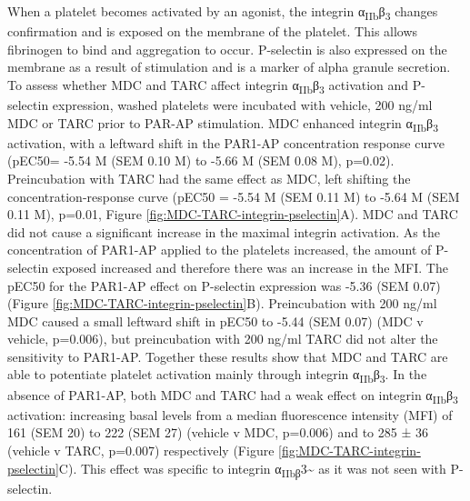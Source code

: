 \documentclass[11pt,twoside]{bristolthesis}
\begin{document}
When a platelet becomes activated by an agonist, the integrin α\textsubscript{IIb}β\textsubscript{3} changes confirmation and is exposed on the membrane of the platelet. This allows fibrinogen to bind and aggregation to occur. P-selectin is also expressed on the membrane as a result of stimulation and is a marker of alpha granule secretion. To assess whether MDC and TARC affect integrin α\textsubscript{IIb}β\textsubscript{3} activation and P-selectin expression, washed platelets were incubated with vehicle, 200 ng/ml MDC or TARC prior to PAR-AP stimulation. MDC enhanced integrin α\textsubscript{IIb}β\textsubscript{3} activation, with a leftward shift in the PAR1-AP concentration response curve (pEC50= -5.54 M (SEM 0.10 M) to -5.66 M (SEM 0.08 M), p=0.02). Preincubation with TARC had the same effect as MDC, left shifting the concentration-response curve (pEC50 = -5.54 M (SEM 0.11 M) to -5.64 M (SEM 0.11 M), p=0.01, Figure \ref{fig:MDC-TARC-integrin-pselectin}A). MDC and TARC did not cause a significant increase in the maximal integrin activation. As the concentration of PAR1-AP applied to the platelets increased, the amount of P-selectin exposed increased and therefore there was an increase in the MFI. The pEC50 for the PAR1-AP effect on P-selectin expression was -5.36 (SEM 0.07) (Figure \ref{fig:MDC-TARC-integrin-pselectin}B). Preincubation with 200 ng/ml MDC caused a small leftward shift in pEC50 to -5.44 (SEM 0.07) (MDC v vehicle, p=0.006), but preincubation with 200 ng/ml TARC did not alter the sensitivity to PAR1-AP. Together these results show that MDC and TARC are able to potentiate platelet activation mainly through integrin α\textsubscript{IIb}β\textsubscript{3}. In the absence of PAR1-AP, both MDC and TARC had a weak effect on integrin α\textsubscript{IIb}β\textsubscript{3} activation: increasing basal levels from a median fluorescence intensity (MFI) of 161 (SEM 20) to 222 (SEM 27) (vehicle v MDC, p=0.006) and to 285 ± 36 (vehicle v TARC, p=0.007) respectively (Figure \ref{fig:MDC-TARC-integrin-pselectin}C). This effect was specific to integrin α\textsubscript{IIbβ}3\textasciitilde{} as it was not seen with P-selectin.
\end{document}
